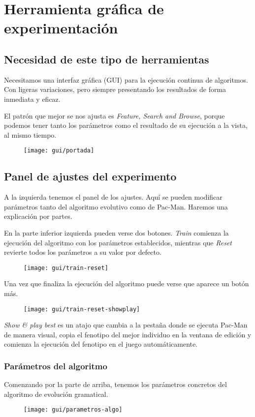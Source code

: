 \chapter{Herramienta gráfica de experimentación}

\section{Necesidad de este tipo de herramientas}
Necesitamos una interfaz gráfica (GUI) para la ejecución continua de algoritmos. Con ligeras variaciones, pero siempre presentando los resultados de forma inmediata y eficaz.

El patrón que mejor se nos ajusta es \textit{Feature, Search and Browse}\cite{tidwell2010designing}, porque podemos tener tanto los parámetros como el resultado de su ejecución a la vista, al mismo tiempo.
\begin{figure}[H]
\centering
\texttt{[image: gui/portada]}
\end{figure}

\section{Panel de ajustes del experimento}
A la izquierda tenemos el panel de los ajustes. Aquí se pueden modificar parámetros tanto del algoritmo evolutivo como de Pac-Man. Haremos una explicación por partes.
 
En la parte inferior izquierda pueden verse dos botones. \textit{Train} comienza la ejecución del algoritmo con los parámetros establecidos, mientras que \textit{Reset} revierte todos los parámetros a su valor por defecto.
\begin{figure}[H]
\centering
\texttt{[image: gui/train-reset]}
\end{figure}

Una vez que finaliza la ejecución del algoritmo puede verse que aparece un botón más.
\begin{figure}[H]
\centering
\texttt{[image: gui/train-reset-showplay]}
\end{figure}

\textit{Show \& play best} es un atajo que cambia a la pestaña donde se ejecuta Pac-Man de manera visual, copia el fenotipo del mejor individuo en la ventana de edición y comienza la ejecución del fenotipo en el juego automáticamente.

\subsection{Parámetros del algoritmo}
Comenzando por la parte de arriba, tenemos los parámetros concretos del algoritmo de evolución gramatical.
\begin{figure}[H]
\centering
\texttt{[image: gui/parametros-algo]}
\end{figure}

